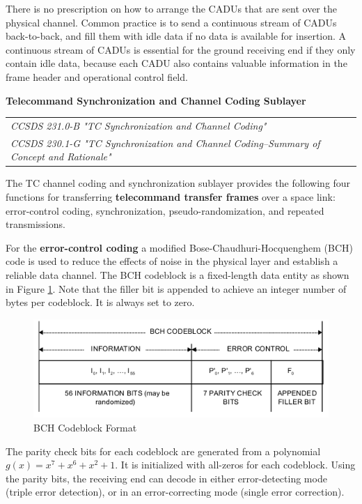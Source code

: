 There is no prescription on how to arrange the CADUs that are sent over the physical channel. Common practice is to send a continuous stream of CADUs back-to-back, and fill them with idle data if no data is available for insertion. A continuous stream of CADUs is essential for the ground receiving end if they only contain idle data, because each CADU also contains valuable information in the frame header and operational control field.

\textbf{Telecommand Synchronization and Channel Coding Sublayer}

\begin{tabular}{l}
\textit{CCSDS 231.0-B "TC Synchronization and Channel Coding" \cite{CCSDS 231.0-B}} \\
\textit{CCSDS 230.1-G "TC Synchronization and Channel Coding--Summary of Concept and Rationale" \cite{CCSDS 230.1-G}}
\end{tabular}

The TC channel coding and synchronization sublayer provides the following four functions for transferring \textbf{telecommand transfer frames} over a space link: error-control coding, synchronization, pseudo-randomization, and repeated transmissions. 

For the \textbf{error-control coding} a modified Bose-Chaudhuri-Hocquenghem (BCH) code is used to reduce the effects of noise in the physical layer and establish a reliable data channel. The BCH codeblock is a fixed-length data entity as shown in Figure \ref{fig:BCH Codeblock Format}. Note that the filler bit is appended to achieve an integer number of bytes per codeblock. It is always set to zero. 

\begin{figure}[h]
\centering\includegraphics[scale=0.7]{fig/bch_codeblock_format}
\caption{BCH Codeblock Format}
\label{fig:BCH Codeblock Format}
\end{figure}

The parity check bits for each codeblock are generated from a polynomial $g(x) = x^{7} + x^{6} +x^{2} + 1$. It is initialized with all-zeros for each codeblock. Using the parity bits, the receiving end can decode in either error-detecting mode (triple error detection), or in an error-correcting mode (single error correction). 

